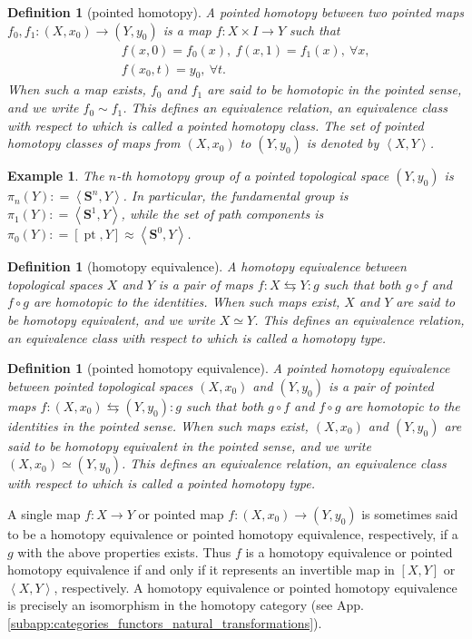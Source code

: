 \documentclass[sort&compress]{elsarticle}
\theoremstyle{theoremstyle}
\theoremstyle{framedtheoremstyle}
\theoremstyle{definitionstyle}
\newtheorem{dfn}[nul]{Definition}%
\theoremstyle{definitionstyle}
\theoremstyle{definitionstyle}
\theoremstyle{definitionstyle}
\newtheorem{exm}[nul]{Example}
\theoremstyle{nameddefinitionstyle}
\theoremstyle{framednameddefinitionstyle}
\theoremstyle{proofstyle}
\theoremstyle{definitionstyle}
\newcommand{\fromto}{\rightarrow}
\renewcommand{\SS}{\mathbf{S}}
\newcommand{\coloneq}{\mathrel{\mathop:}=}
\newcommand{\homotopic}{\simeq}
\newcommand{\angles}[1]{\left\langle #1 \right\rangle}
\newcommand{\brackets}[1]{\left[ #1 \right]}
\DeclareMathOperator{\pt}{pt}
\begin{document}
\begin{appendices}
\begin{dfn}[pointed homotopy]
A pointed homotopy between two pointed maps $f_0, f_1: (X,x_0) \fromto (Y,y_0)$ is a map $f: X \times I \fromto Y$ such that
\begin{eqnarray}
&&f(x,0) = f_0(x), ~ f(x,1)=f_1(x),~ \forall x, \\
&&f(x_0, t) = y_0, ~\forall t.
\end{eqnarray}
When such a map exists, $f_0$ and $f_1$ are said to be homotopic in the pointed sense, and we write $f_0 \sim f_1$. This defines an equivalence relation, an equivalence class with respect to which is called a pointed homotopy class. The set of pointed homotopy classes of maps from $(X,x_0)$ to $(Y,y_0)$ is denoted by $\angles{X, Y}$.
\end{dfn}

\begin{exm}
The $n$-th homotopy group of a pointed topological space $(Y,y_0)$ is $\pi_n(Y) \coloneq \angles{\SS^n, Y}$. In particular, the fundamental group is $\pi_1(Y) \coloneq \angles{\SS^1, Y}$, while the set of path components is $\pi_0(Y) \coloneq \brackets{\pt, Y} \approx \angles{\SS^0, Y}$.
\end{exm}

\begin{dfn}[homotopy equivalence]
A homotopy equivalence between topological spaces $X$ and $Y$ is a pair of maps $f: X \leftrightarrows Y: g$ such that both $g\circ f$ and $f \circ g$ are homotopic to the identities. When such maps exist, $X$ and $Y$ are said to be homotopy equivalent, and we write $X \homotopic Y$. This defines an equivalence relation, an equivalence class with respect to which is called a homotopy type.
\end{dfn}

\begin{dfn}[pointed homotopy equivalence]
A pointed homotopy equivalence between pointed topological spaces $(X,x_0)$ and $(Y,y_0)$ is a pair of pointed maps $f: (X,x_0) \leftrightarrows (Y,y_0): g$ such that both $g\circ f$ and $f \circ g$ are homotopic to the identities in the pointed sense. When such maps exist, $(X,x_0)$ and $(Y,y_0)$ are said to be homotopy equivalent in the pointed sense, and we write $(X,x_0) \homotopic (Y, y_0)$. This defines an equivalence relation, an equivalence class with respect to which is called a pointed homotopy type.
\end{dfn}

A single map $f: X \fromto Y$ or pointed map $f: (X,x_0) \fromto (Y, y_0)$ is sometimes said to be a homotopy equivalence or pointed homotopy equivalence, respectively, if a $g$ with the above properties exists. Thus $f$ is a homotopy equivalence or pointed homotopy equivalence if and only if it represents an invertible map in $\brackets{X, Y}$ or $\angles{X, Y}$, respectively. A homotopy equivalence or pointed homotopy equivalence is precisely an isomorphism in the homotopy category (see App.\,\ref{subapp:categories_functors_natural_transformations}).


\end{appendices}
\end{document}
